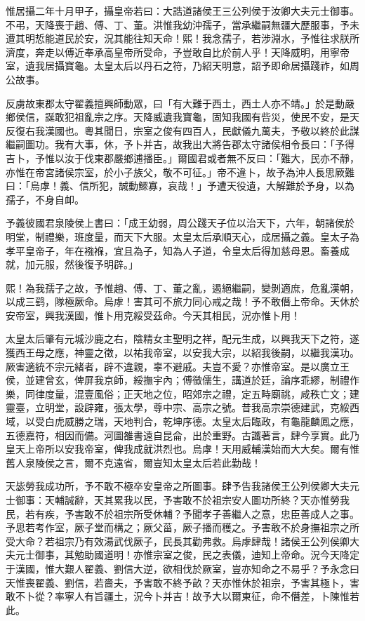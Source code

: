 \begin{pinyinscope}
惟居攝二年十月甲子，攝皇帝若曰：大誥道諸侯王三公列侯于汝卿大夫元士御事。不弔，天降喪于趙、傅、丁、董。洪惟我幼沖孺子，當承繼嗣無疆大歷服事，予未遭其明悊能道民於安，況其能往知天命！熙！我念孺子，若涉淵水，予惟往求朕所濟度，奔走以傅近奉承高皇帝所受命，予豈敢自比於前人乎！天降威明，用寧帝室，遺我居攝寶龜。太皇太后以丹石之符，乃紹天明意，詔予即命居攝踐祚，如周公故事。

反虜故東郡太守翟義擅興師動眾，曰「有大難于西土，西土人亦不靖。」於是動嚴鄉侯信，誕敢犯祖亂宗之序。天降威遺我寶龜，固知我國有呰災，使民不安，是天反復右我漢國也。粵其聞日，宗室之俊有四百人，民獻儀九萬夫，予敬以終於此謀繼嗣圖功。我有大事，休，予卜并吉，故我出大將告郡太守諸侯相令長曰：「予得吉卜，予惟以汝于伐東郡嚴鄉逋播臣。」爾國君或者無不反曰：「難大，民亦不靜，亦惟在帝宮諸侯宗室，於小子族父，敬不可征。」帝不違卜，故予為沖人長思厥難曰：「烏虖！義、信所犯，誠動鰥寡，哀哉！」予遭天役遺，大解難於予身，以為孺子，不身自卹。

予義彼國君泉陵侯上書曰：「成王幼弱，周公踐天子位以治天下，六年，朝諸侯於明堂，制禮樂，班度量，而天下大服。太皇太后承順天心，成居攝之義。皇太子為孝平皇帝子，年在襁褓，宜且為子，知為人子道，令皇太后得加慈母恩。畜養成就，加元服，然後復予明辟。」

熙！為我孺子之故，予惟趙、傅、丁、董之亂，遏絕繼嗣，變剝適庶，危亂漢朝，以成三鹞，隊極厥命。烏虖！害其可不旅力同心戒之哉！予不敢僭上帝命。天休於安帝室，興我漢國，惟卜用克綏受茲命。今天其相民，況亦惟卜用！

太皇太后肇有元城沙鹿之右，陰精女主聖明之祥，配元生成，以興我天下之符，遂獲西王母之應，神靈之徵，以祐我帝室，以安我大宗，以紹我後嗣，以繼我漢功。厥害適統不宗元緒者，辟不違親，辜不避戚。夫豈不愛？亦惟帝室。是以廣立王侯，並建曾玄，俾屏我京師，綏撫宇內；傅徵儒生，講道於廷，論序乖繆，制禮作樂，同律度量，混壹風俗；正天地之位，昭郊宗之禮，定五畤廟祧，咸秩亡文；建靈臺，立明堂，設辟雍，張太學，尊中宗、高宗之號。昔我高宗崇德建武，克綏西域，以受白虎威勝之瑞，天地判合，乾坤序德。太皇太后臨政，有龜龍麟鳳之應，五德嘉符，相因而備。河圖雒書遠自昆侖，出於重野。古讖著言，肆今享實。此乃皇天上帝所以安我帝室，俾我成就洪烈也。烏虖！天用威輔漢始而大大矣。爾有惟舊人泉陵侯之言，爾不克遠省，爾豈知太皇太后若此勤哉！

天毖勞我成功所，予不敢不極卒安皇帝之所圖事。肆予告我諸侯王公列侯卿大夫元士御事：天輔誠辭，天其累我以民，予害敢不於祖宗安人圖功所終？天亦惟勞我民，若有疾，予害敢不於祖宗所受休輔？予聞孝子善繼人之意，忠臣善成人之事。予思若考作室，厥子堂而構之；厥父菑，厥子播而穫之。予害敢不於身撫祖宗之所受大命？若祖宗乃有效湯武伐厥子，民長其勸弗救。烏虖肆哉！諸侯王公列侯卿大夫元士御事，其勉助國道明！亦惟宗室之俊，民之表儀，迪知上帝命。況今天降定于漢國，惟大艱人翟義、劉信大逆，欲相伐於厥室，豈亦知命之不易乎？予永念曰天惟喪翟義、劉信，若嗇夫，予害敢不終予畝？天亦惟休於祖宗，予害其極卜，害敢不卜從？率寧人有旨疆土，況今卜并吉！故予大以爾東征，命不僭差，卜陳惟若此。


\end{pinyinscope}
